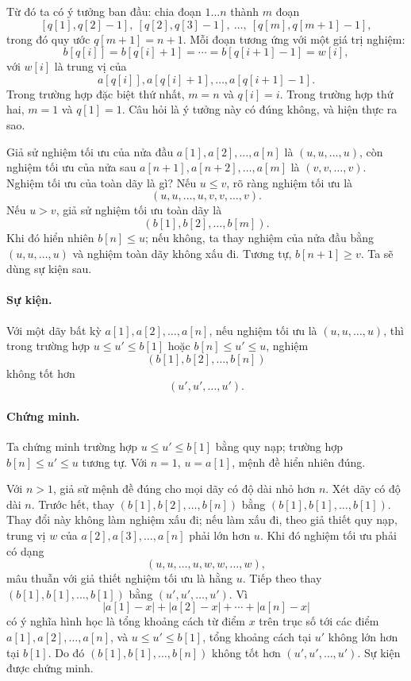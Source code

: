 \documentclass[11pt]{article}
\begin{document}
Từ đó ta có ý tưởng ban đầu: chia đoạn \(1\ldots n\) thành \(m\) đoạn
\[
  [q[1],q[2]-1],\ [q[2],q[3]-1],\ \ldots,\ [q[m],q[m+1]-1],
\]
trong đó quy ước \(q[m+1]=n+1\). Mỗi đoạn tương ứng với một giá trị nghiệm:
\[
  b[q[i]]=b[q[i]+1]=\cdots=b[q[i+1]-1]=w[i],
\]
với \(w[i]\) là trung vị của
\[
  a[q[i]],a[q[i]+1],\ldots,a[q[i+1]-1].
\]
Trong trường hợp đặc biệt thứ nhất, \(m=n\) và \(q[i]=i\). Trong trường hợp thứ
hai, \(m=1\) và \(q[1]=1\). Câu hỏi là ý tưởng này có đúng không, và hiện thực
ra sao.

Giả sử nghiệm tối ưu của nửa đầu \(a[1],a[2],\ldots,a[n]\) là
\((u,u,\ldots,u)\), còn nghiệm tối ưu của nửa sau
\(a[n+1],a[n+2],\ldots,a[m]\) là \((v,v,\ldots,v)\). Nghiệm tối ưu của toàn dãy
là gì? Nếu \(u\le v\), rõ ràng nghiệm tối ưu là
\[
  (u,u,\ldots,u,v,v,\ldots,v).
\]
Nếu \(u>v\), giả sử nghiệm tối ưu toàn dãy là
\[
  (b[1],b[2],\ldots,b[m]).
\]
Khi đó hiển nhiên \(b[n]\le u\); nếu không, ta thay nghiệm của nửa đầu bằng
\((u,u,\ldots,u)\) và nghiệm toàn dãy không xấu đi. Tương tự, \(b[n+1]\ge v\).
Ta sẽ dùng sự kiện sau.

\paragraph{Sự kiện.}
Với một dãy bất kỳ \(a[1],a[2],\ldots,a[n]\), nếu nghiệm tối ưu là
\((u,u,\ldots,u)\), thì trong trường hợp \(u\le u'\le b[1]\) hoặc
\(b[n]\le u'\le u\), nghiệm
\[
  (b[1],b[2],\ldots,b[n])
\]
không tốt hơn
\[
  (u',u',\ldots,u').
\]

\paragraph{Chứng minh.}
Ta chứng minh trường hợp \(u\le u'\le b[1]\) bằng quy nạp; trường hợp
\(b[n]\le u'\le u\) tương tự. Với \(n=1\), \(u=a[1]\), mệnh đề hiển nhiên đúng.

Với \(n>1\), giả sử mệnh đề đúng cho mọi dãy có độ dài nhỏ hơn \(n\). Xét dãy
có độ dài \(n\). Trước hết, thay \((b[1],b[2],\ldots,b[n])\) bằng
\((b[1],b[1],\ldots,b[1])\). Thay đổi này không làm nghiệm xấu đi; nếu làm xấu
đi, theo giả thiết quy nạp, trung vị \(w\) của \(a[2],a[3],\ldots,a[n]\) phải
lớn hơn \(u\). Khi đó nghiệm tối ưu phải có dạng
\[
  (u,u,\ldots,u,w,w,\ldots,w),
\]
mâu thuẫn với giả thiết nghiệm tối ưu là hằng \(u\). Tiếp theo thay
\((b[1],b[1],\ldots,b[1])\) bằng \((u',u',\ldots,u')\). Vì
\[
  |a[1]-x|+|a[2]-x|+\cdots+|a[n]-x|
\]
có ý nghĩa hình học là tổng khoảng cách từ điểm \(x\) trên trục số tới các điểm
\(a[1],a[2],\ldots,a[n]\), và \(u\le u'\le b[1]\), tổng khoảng cách tại \(u'\)
không lớn hơn tại \(b[1]\). Do đó \((b[1],b[1],\ldots,b[n])\) không tốt hơn
\((u',u',\ldots,u')\). Sự kiện được chứng minh.
\end{document}
